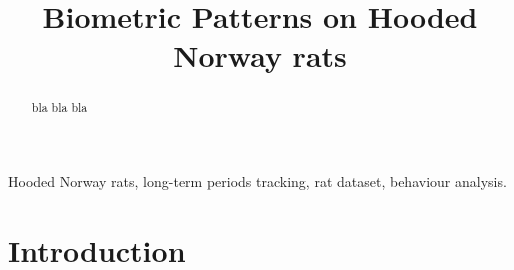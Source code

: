 \documentclass[conference]{IEEEtran}
\begin{document}
%
\title{Biometric Patterns on Hooded Norway rats}

\author{
\and
{}

}



\maketitle


\begin{abstract}
bla bla bla
\end{abstract}

\begin{IEEEkeywords}
Hooded Norway rats,  long-term periods tracking, rat dataset, behaviour analysis.
\end{IEEEkeywords}






%
\IEEEpeerreviewmaketitle



\section{Introduction}
\end{document}

